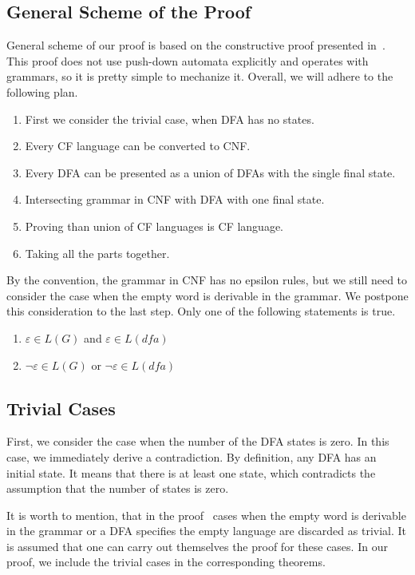 \subsection{General Scheme of the Proof}

General scheme of our proof is based on the constructive proof presented in~\cite{beigelproof}.
This proof does not use push-down automata explicitly and operates with grammars, so it is pretty simple to mechanize it.
Overall, we will adhere to the following plan. 

\begin{enumerate}
    \item First we consider the trivial case, when DFA has no states.
    \item Every CF language can be converted to CNF.
    \item Every DFA can be presented as a union of DFAs with the single final state.
    \item Intersecting grammar in CNF with DFA with one final state.
    \item Proving than union of CF languages is CF language.
    \item Taking all the parts together.
\end{enumerate}

By the convention, the grammar in CNF has no epsilon rules, but we still need to consider the case when the empty word is derivable in the grammar. We postpone this consideration to the last step. Only one of the following statements is true. 

\begin{enumerate}
	\item $\varepsilon \in L(G)$ and $\varepsilon \in L(\textit{dfa})$
	\item $\neg \varepsilon \in L(G)$ or $\neg \varepsilon \in L(\textit{dfa})$
\end{enumerate}

\subsection{Trivial Cases}

First, we consider the case when the number of the DFA states is zero. 
In this case, we immediately derive a contradiction.
By definition, any DFA has an initial state. 
It means that there is at least one state, which contradicts the assumption that the number of states is zero.

It is worth to mention, that in the proof~\cite{beigelproof} cases when the empty word is derivable in the grammar or a DFA specifies the empty language are discarded as trivial.
It is assumed that one can carry out themselves the proof for these cases.
In our proof, we include the trivial cases in the corresponding theorems.

